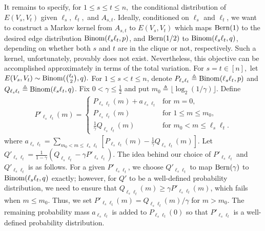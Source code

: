 It remains to specify, for $1\leq s \leq t \leq n,$
the conditional distribution of $E(V_s,V_t)$ given $\ell_s, \ell_t,$ and $A_{s,t}.$
Ideally, conditioned on $\ell_s$ and $\ell_t$, we want to construct
a Markov kernel from $A_{s,t}$ to $E(V_s,V_t)$ which maps  ${\rm Bern}(1)$  to the desired edge distribution ${\rm Binom}(\ell_s\ell_t,p)$, and ${\rm Bern}(1/2)$  to ${\rm Binom}(\ell_s\ell_t,q)$, depending on whether both $s$ and $t$ are in the clique or not, respectively. Such a kernel, unfortunately, provably does not exist. Nevertheless, this objective can be accomplished approximately in terms of the total variation. For $s=t \in [n],$  let $E(V_s,V_t)\sim{\rm Binom}( \binom{\ell_t}{2}, q).$
For $ 1 \le s < t \le n$, denote $P_{\ell_s \ell_t} \triangleq {\rm Binom}(\ell_s \ell_t,p)$ and $Q_{\ell_s \ell_t} \triangleq {\rm Binom}(\ell_s \ell_t,q)$.
Fix $0 < \gamma \leq \frac{1}{2}$ and put $m_0 \triangleq \lfloor \log_2 (1/\gamma) \rfloor$.
Define
    \begin{align*}
    P'_{\ell_s \ell_t} (m)=  \left\{
    \begin{array}{rl}
    P_{\ell_s \ell_t} (m) + a_{\ell_s \ell_t} & \text{for } m=0,\\
    P_{\ell_s \ell_t}(m) & \text{for } 1 \le m \le m_0, \\
    \frac{1}{\gamma} Q_{\ell_s \ell_t} (m) & \text{for } m_0 < m \le \ell_s \ell_t .
    \end{array} \right.
    \end{align*}
    where $a_{\ell_s \ell_t}=\sum_{m_0<m \le  \ell_s\ell_t} [ P_{\ell_s \ell_t}(m) - \frac{1}{\gamma} Q_{\ell_s \ell_t}(m) ]$.
    Let $Q'_{\ell_s \ell_t} = \frac{1}{1-\gamma} (Q_{\ell_s \ell_t} - \gamma P'_{\ell_s \ell_t})$.
The idea behind our choice of $P'_{\ell_s \ell_t}$ and $Q'_{\ell_s \ell_t}$ is as follows. 
For a given $P'_{\ell_s \ell_t}$, we choose $Q'_{\ell_s \ell_t}$ to
map ${\rm Bern}(\gamma)$ to ${\rm Binom}(\ell_s\ell_t,q)$ exactly;
however, for $Q'$ to be a well-defined
probability distribution, we need to ensure that $Q_{\ell_s \ell_t} (m) \ge \gamma P'_{\ell_s \ell_t}(m)$, which fails when $m \leq m_0$. Thus,
we set $P'_{\ell_s \ell_t} (m) = Q_{\ell_s \ell_t} (m) /\gamma$ for $m>m_0$. The remaining probability mass $a_{\ell_s \ell_t}$ is added to $P_{\ell_s \ell_t} (0)$ so that $P'_{\ell_s \ell_t}$ is a well-defined probability distribution. 




